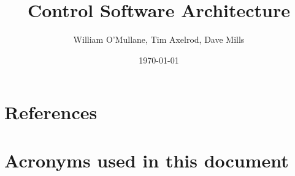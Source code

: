 \documentclass[TS,lsstdraft,toc]{lsstdoc}
\title{Control Software Architecture}
\author{%
William O'Mullane, Tim Axelrod, Dave Mills
}
\date{\today}
\begin{document}
\maketitle






\appendix
\section{References} \label{sec:bib}


\section{Acronyms used in this document}\label{sec:acronyms}

\end{document}
